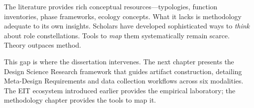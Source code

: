 \documentclass[../main.tex]{subfiles}
\begin{document}
\vspace{1em}

The literature provides rich conceptual resources---typologies, function inventories, phase frameworks, ecology concepts. What it lacks is methodology adequate to its own insights. Scholars have developed sophisticated ways to \emph{think} about role constellations. Tools to \emph{map} them systematically remain scarce. Theory outpaces method.

This gap is where the dissertation intervenes. The next chapter presents the Design Science Research framework that guides artifact construction, detailing Meta-Design Requirements and data collection workflows across six modalities. The EIT ecosystem introduced earlier provides the empirical laboratory; the methodology chapter provides the tools to map it.
\end{document}
